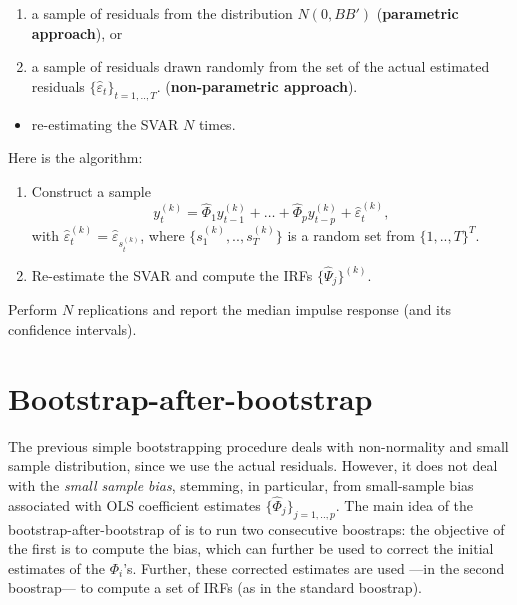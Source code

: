 \documentclass[
  12pt,
]{book}
\providecommand{\tightlist}{%
  \setlength{\itemsep}{0pt}\setlength{\parskip}{0pt}}
\theoremstyle{definition}
\theoremstyle{definition}
\theoremstyle{definition}
\theoremstyle{definition}
\theoremstyle{remark}
\begin{document}
\begin{enumerate}
\def\labelenumi{\alph{enumi}.}
\tightlist
\item
  a sample of residuals from the distribution \(N(0,BB')\) (\textbf{parametric approach}), or
\item
  a sample of residuals drawn randomly from the set of the actual estimated residuals \(\{\hat\varepsilon_t\}_{t=1,..,T}\). (\textbf{non-parametric approach}).
\end{enumerate}

\begin{itemize}
\tightlist
\item
  re-estimating the SVAR \(N\) times.
\end{itemize}

Here is the algorithm:

\begin{enumerate}
\def\labelenumi{\arabic{enumi}.}
\tightlist
\item
  Construct a sample
  \[
  y_t^{(k)}=\widehat{\Phi}_1 y_{t-1}^{(k)} + \dots + \widehat{\Phi}_p y_{t-p}^{(k)} + \hat\varepsilon_t^{(k)},
  \]
  with \(\hat\varepsilon_{t}^{(k)}=\hat\varepsilon_{s_t^{(k)}}\), where \(\{s_1^{(k)},..,s_T^{(k)}\}\) is a random set from \(\{1,..,T\}^T\).
\item
  Re-estimate the SVAR and compute the IRFs \(\{\widehat{\Psi}_j\}^{(k)}\).
\end{enumerate}

Perform \(N\) replications and report the median impulse response (and its confidence intervals).

\hypertarget{bootstrap-after-bootstrap}{%
\section{Bootstrap-after-bootstrap}\label{bootstrap-after-bootstrap}}

The previous simple bootstrapping procedure deals with non-normality and small sample distribution, since we use the actual residuals. However, it does not deal with the \emph{small sample bias}, stemming, in particular, from small-sample bias associated with OLS coefficient estimates \(\{\widehat{\Phi}_j\}_{j=1,..,p}\). The main idea of the bootstrap-after-bootstrap of \citet{Kilian_1998} is to run two consecutive boostraps: the objective of the first is to compute the bias, which can further be used to correct the initial estimates of the \(\Phi_i\)'s. Further, these corrected estimates are used ---in the second boostrap--- to compute a set of IRFs (as in the standard boostrap).
\end{document}
